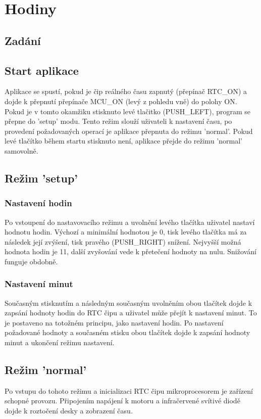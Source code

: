 \documentclass[10pt,a4paper]{article}
\begin{document}
\section*{Hodiny}
\subsection*{Zadání}
\subsection*{Start aplikace}
Aplikace se spustí, pokud je čip reálného času zapnutý (přepínač RTC\_ON) a dojde k přepnutí přepínače MCU\_ON (levý z pohledu vně) do polohy ON. Pokud je v tomto okamžiku stisknuto levé tlačitko (PUSH\_LEFT), program se přepne do 'setup' modu. Tento režim slouží uživateli k nastavení času, po provedení požadovaných operací je aplikace přepnuta do režimu 'normal'. Pokud levé tlačítko během startu stisknuto není, aplikace přejde do režimu 'normal' samovolně.
\subsection*{Režim 'setup'}
\subsubsection*{Nastavení hodin}
Po vstoupení do nastavovacího režimu a uvolnění levého tlačítka uživatel nastaví hodnotu hodin. Výchozí a minimální hodnotou je 0, tisk levého tlačítka má za následek její zvýšení, tisk pravého (PUSH\_RIGHT) snížení. Nejvyšší možná hodnota hodin je 11, další zvyšování vede k přetečení hodnoty na nulu. Snižování funguje obdobně.

\subsubsection*{Nastavení minut}
Současným stisknutím a následným současným uvolněním obou tlačítek dojde k zapsání hodnoty hodin do RTC čipu a uživatel může přejít k nastavení minut. To je postaveno na totožném principu, jako nastavení hodin. Po nastavení požadované hodnoty a současném stisku obou tlačítek dojde k zapsání hodnoty minut a ukončení režimu nastavení.
\subsection*{Režim 'normal'}
Po vstupu do tohoto režimu a inicializaci RTC čipu mikroprocesorem je zařízení schopné provozu. Připojením napájení k motoru a infračervené svítivé diodě dojde k roztočení desky a zobrazení času.
\end{document}
